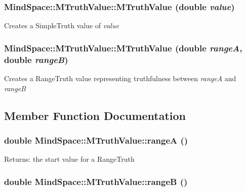 \subsubsection{\setlength{\rightskip}{0pt plus 5cm}Mind\-Space::MTruth\-Value::MTruth\-Value (double {\em value})\hspace{0.3cm}{\tt  [inline]}}\label{classMindSpace_1_1MTruthValue_afc9e155b1af9ee31163e2eccb00da8b}


Creates a Simple\-Truth value of {\em value\/} 
\subsubsection{\setlength{\rightskip}{0pt plus 5cm}Mind\-Space::MTruth\-Value::MTruth\-Value (double {\em range\-A}, double {\em range\-B})\hspace{0.3cm}{\tt  [inline]}}\label{classMindSpace_1_1MTruthValue_6b62a33ee963af64eaff59c8ec777cd9}


Creates a Range\-Truth value representing truthfulness between {\em range\-A\/} and {\em range\-B\/} 

\subsection{Member Function Documentation}
\subsubsection{\setlength{\rightskip}{0pt plus 5cm}double Mind\-Space::MTruth\-Value::range\-A ()\hspace{0.3cm}{\tt  [inline]}}\label{classMindSpace_1_1MTruthValue_0115aba6d64c95360f01287fd69ead61}


\begin{Desc}
\item[Returns:]the start value for a Range\-Truth \end{Desc}
\subsubsection{\setlength{\rightskip}{0pt plus 5cm}double Mind\-Space::MTruth\-Value::range\-B ()\hspace{0.3cm}{\tt  [inline]}}\label{classMindSpace_1_1MTruthValue_00b1172aa5ba4ea690149dc6fa8ae0ec}



